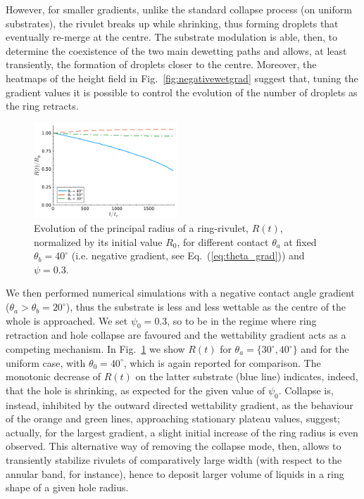 \documentclass[twoside,twocolumn,9pt]{article}
\begin{document}
However, for smaller gradients, unlike the standard collapse process (on uniform substrates), the rivulet breaks up while shrinking, thus forming droplets that eventually re-merge at the centre. 
The substrate modulation is able, then, to determine the coexistence of the two main dewetting paths and allows, at least transiently, the formation of droplets closer to the centre. 
Moreover, the heatmaps of the height field in Fig.~\ref{fig:negativewetgrad} suggest that, tuning the gradient values it is possible to control the evolution of the number of droplets as the ring retracts.\\
\begin{figure}
    \centering
    \includegraphics[width=0.48\textwidth]{Figure_8.pdf}
    \caption{Evolution of the principal radius of a ring-rivulet, $R(t)$, normalized by its initial value $R_0$, for different contact $\theta_a$ at fixed $\theta_b = 40^{\circ}$ (i.e. negative gradient, see Eq.~(\ref{eq:theta_grad})) and $\psi = 0.3$.}
    \label{fig:positivewetgrad}
\end{figure}
We then performed numerical simulations with a negative contact angle gradient ($\theta_a > \theta_b = 20^{\circ}$), thus the substrate is less and less wettable as the centre of the whole is approached.
We set $\psi_0 = 0.3$, so to be in the regime where ring retraction and hole collapse are favoured and the wettability gradient acts as a competing mechanism.
In Fig.~\ref{fig:positivewetgrad} we show $R(t)$ for $\theta_a = \{ 30^{\circ}, 40^{\circ} \}$ and for the uniform case, with $\theta_0 = 40^{\circ}$, which is again reported for comparison.
The monotonic decrease of $R(t)$ on the latter substrate (blue line) indicates, indeed, that the hole is shrinking, as expected for the given value of $\psi_0$. 
Collapse is, instead, inhibited by the outward directed wettability gradient, as the behaviour of the orange and green lines, approaching stationary plateau values, suggest; actually, for the largest gradient, a slight initial increase of the ring radius is even observed. 
This alternative way of removing the collapse mode, then, allows to transiently stabilize rivulets of comparatively large width (with respect to the annular band, for instance), hence to deposit larger volume of liquids in a ring shape of a given hole radius. 
\end{document}
